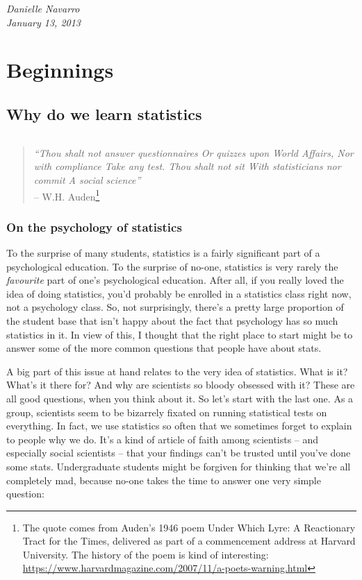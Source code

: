 \documentclass[
  letterpaper,
]{book}
\begin{document}
\emph{Danielle Navarro\\
January 13, 2013}

\part{Beginnings}

\hypertarget{why-do-we-learn-statistics}{%
\chapter{Why do we learn statistics}\label{why-do-we-learn-statistics}}

\[ \]

\begin{quote}
\emph{``Thou shalt not answer questionnaires\emph{\hfill\break
}Or quizzes upon World Affairs,\emph{\hfill\break
}Nor with compliance\emph{\hfill\break
}Take any test. Thou shalt not sit\emph{\hfill\break
}With statisticians nor commit\emph{\hfill\break
}A social science''}\\
-- W.H. Auden\footnote{The quote comes from Auden's 1946 poem Under
  Which Lyre: A Reactionary Tract for the Times, delivered as part of a
  commencement address at Harvard University. The history of the poem is
  kind of interesting:
  \url{https://www.harvardmagazine.com/2007/11/a-poets-warning.html}}
\end{quote}

\hypertarget{on-the-psychology-of-statistics}{%
\section{On the psychology of
statistics}\label{on-the-psychology-of-statistics}}

To the surprise of many students, statistics is a fairly significant
part of a psychological education. To the surprise of no-one, statistics
is very rarely the \emph{favourite} part of one's psychological
education. After all, if you really loved the idea of doing statistics,
you'd probably be enrolled in a statistics class right now, not a
psychology class. So, not surprisingly, there's a pretty large
proportion of the student base that isn't happy about the fact that
psychology has so much statistics in it. In view of this, I thought that
the right place to start might be to answer some of the more common
questions that people have about stats.

A big part of this issue at hand relates to the very idea of statistics.
What is it? What's it there for? And why are scientists so bloody
obsessed with it? These are all good questions, when you think about it.
So let's start with the last one. As a group, scientists seem to be
bizarrely fixated on running statistical tests on everything. In fact,
we use statistics so often that we sometimes forget to explain to people
why we do. It's a kind of article of faith among scientists -- and
especially social scientists -- that your findings can't be trusted
until you've done some stats. Undergraduate students might be forgiven
for thinking that we're all completely mad, because no-one takes the
time to answer one very simple question:
\end{document}
